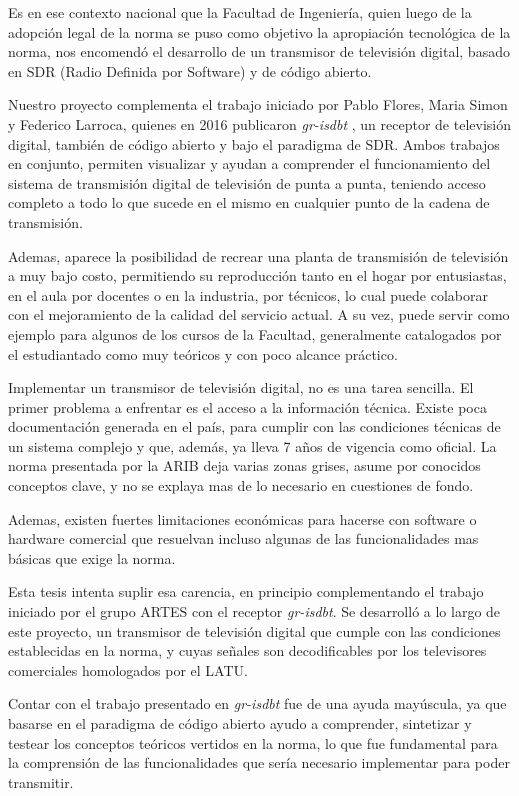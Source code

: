 Es en ese contexto nacional que la Facultad de Ingeniería, quien luego de la adopción legal de la norma se puso como objetivo la apropiación tecnológica de la norma, nos encomendó el desarrollo de un transmisor de televisión digital, basado en SDR (Radio Definida por Software) y de código abierto.

Nuestro proyecto complementa el trabajo iniciado por Pablo Flores, Maria Simon y Federico Larroca, quienes en 2016 publicaron \textit{gr-isdbt} \cite{gr-isdbt}, un receptor de televisión digital, también de código abierto y bajo el paradigma de SDR. Ambos trabajos en conjunto, permiten visualizar y ayudan a comprender el funcionamiento del sistema de transmisión digital de televisión de punta a punta, teniendo acceso completo a todo lo que sucede en el mismo en cualquier punto de la cadena de transmisión. 

Ademas, aparece la posibilidad de recrear una planta de transmisión de televisión a muy bajo costo, permitiendo su reproducción tanto en el hogar por entusiastas, en el aula por docentes o en la industria, por técnicos, lo cual puede colaborar con el mejoramiento de la calidad del servicio actual. A su vez, puede servir como ejemplo para algunos de los cursos de la Facultad, generalmente catalogados por el estudiantado como muy teóricos y con poco alcance práctico. 

Implementar un transmisor de televisión digital, no es una tarea sencilla. El primer problema a enfrentar es el acceso a la información técnica. Existe poca documentación generada en el país, para cumplir con las condiciones técnicas de un sistema complejo y que, además, ya lleva 7 años de vigencia como oficial. La norma presentada por la ARIB deja varias zonas grises, asume por conocidos conceptos clave, y no se explaya mas de lo necesario en cuestiones de fondo. 

Ademas, existen fuertes limitaciones económicas para hacerse con software o hardware comercial que resuelvan incluso algunas de las funcionalidades mas básicas que exige la norma. 

Esta tesis intenta suplir esa carencia, en principio complementando el trabajo iniciado por el grupo ARTES con el receptor \textit{gr-isdbt}. Se desarrolló a lo largo de este proyecto, un transmisor de televisión digital que cumple con las condiciones establecidas en la norma, y cuyas señales son decodificables por los televisores comerciales homologados por el LATU.

Contar con el trabajo presentado en \textit{gr-isdbt} fue de una ayuda mayúscula, ya que basarse en el paradigma de código abierto ayudo a comprender, sintetizar y testear los conceptos teóricos vertidos en la norma, lo que fue fundamental para la comprensión de las funcionalidades que sería necesario implementar para poder transmitir. 


